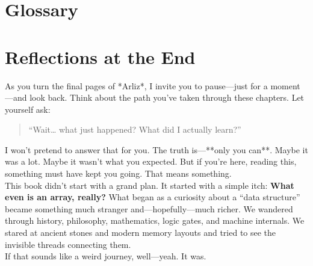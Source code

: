 \backmatter

\pagestyle{backmatter}

\appendix
	\chapter*{Glossary}
	\begin{multicols}{2}
			
	\end{multicols}
	
	\printbibliography[title={Bibliography \& Further Reading}]
		
	\chapter*{Reflections at the End}
	
	As you turn the final pages of *Arliz*, I invite you to pause—just for a moment—and look back. Think about the path you’ve taken through these chapters. Let yourself ask:  
	\begin{quote}
		“Wait… what just happened? What did I actually learn?”
	\end{quote}
	I won’t pretend to answer that for you. The truth is—**only you can**. Maybe it was a lot. Maybe it wasn’t what you expected. But if you’re here, reading this, something must have kept you going. That means something. \\	
	This book didn’t start with a grand plan. It started with a simple itch: \textbf{What even is an array, really?} What began as a curiosity about a “data structure” became something much stranger and—hopefully—much richer. We wandered through history, philosophy, mathematics, logic gates, and machine internals. We stared at ancient stones and modern memory layouts and tried to see the invisible threads connecting them.\\
	If that sounds like a weird journey, well—yeah. It was.
		

